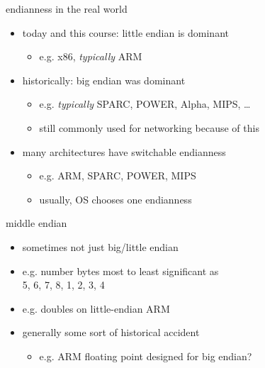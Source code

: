 \begin{frame}{endianness in the real world}
\begin{itemize}
\item today and this course: little endian is dominant
    \begin{itemize}
    \item e.g. x86, \textit{typically} ARM
    \end{itemize}
\item historically: big endian was dominant
    \begin{itemize}
    \item e.g. \textit{typically} SPARC, POWER, Alpha, MIPS, \ldots
    \item still commonly used for networking because of this
    \end{itemize}
\item many architectures have switchable endianness
    \begin{itemize}
    \item e.g. ARM, SPARC, POWER, MIPS
    \item usually, OS chooses one endianness
    \end{itemize}
\end{itemize}
\end{frame}

\begin{frame}{middle endian}
\begin{itemize}
\item sometimes not just big/little endian
\item e.g. number bytes most to least significant as \\
    5, 6, 7, 8, 1, 2, 3, 4
\item e.g. doubles on little-endian ARM
\item generally some sort of historical accident
    \begin{itemize}
    \item e.g. ARM floating point designed for big endian?
    \end{itemize}
\end{itemize}
\end{frame}

